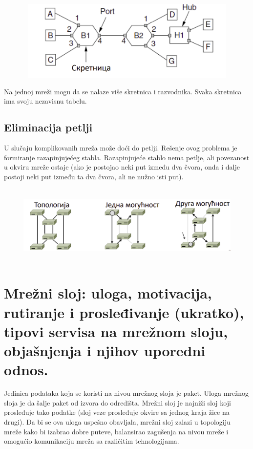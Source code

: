 \documentclass[a4paper]{article}
\begin{document}
        \begin{figure}[H]
            \begin{center}
                \includegraphics[width=120mm,height=40mm]{Slike/skretnice_komplikovanija_mreza.png}
            \end{center}
        \end{figure}
        Na jednoj mreži mogu da se nalaze više skretnica i razvodnika. Svaka skretnica ima svoju
        nezavisnu tabelu.

    \subsection{Eliminacija petlji}
        U slučaju komplikovanih mreža može doći do petlji. Rešenje ovog problema je formiranje
        razapinjujećeg stabla. Razapinjujeće stablo nema petlje, ali povezanost u okviru mreže ostaje 
        (ako je postojao neki put između dva čvora, onda i dalje postoji neki put između
        ta dva čvora, ali ne nužno isti put). 
        \begin{figure}[H]
            \begin{center}
                \includegraphics[width=120mm,height=40mm]{Slike/skretnice_petlje.png}
            \end{center}
        \end{figure}  
        
\section{Mrežni sloj: uloga, motivacija, rutiranje i prosleđivanje (ukratko), tipovi servisa na
mrežnom sloju, objašnjenja i njihov uporedni odnos.}
    Jedinica podataka koja se koristi na nivou mrežnog sloja je paket. Uloga mrežnog sloja
    je da šalje paket od izvora do odredišta. Mrežni sloj je najniži sloj koji prosleđuje tako
    podatke (sloj veze prosleđuje okvire sa jednog kraja žice na drugi). Da bi se ova uloga uspešno
    obavljala, mrežni sloj zalazi u topologiju mreže kako bi izabrao dobre puteve, balansirao
    zagušenja na nivou mreže i omogućio komunikaciju mreža sa različitim tehnologijama.\\
    
\end{document}
